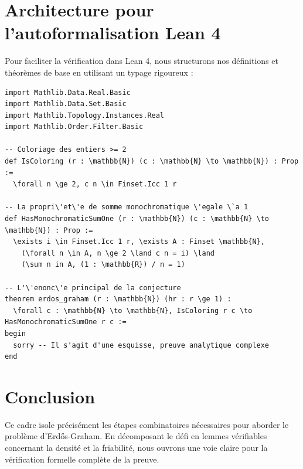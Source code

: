 \documentclass[12pt,a4paper]{article}
\begin{document}
\section{Architecture pour l'autoformalisation Lean 4}
Pour faciliter la v\'erification dans Lean 4, nous structurons nos d\'efinitions et th\'eor\`emes de base en utilisant un typage rigoureux :

\begin{verbatim}
import Mathlib.Data.Real.Basic
import Mathlib.Data.Set.Basic
import Mathlib.Topology.Instances.Real
import Mathlib.Order.Filter.Basic

-- Coloriage des entiers >= 2
def IsColoring (r : \mathbb{N}) (c : \mathbb{N} \to \mathbb{N}) : Prop :=
  \forall n \ge 2, c n \in Finset.Icc 1 r

-- La propri\'et\'e de somme monochromatique \'egale \`a 1
def HasMonochromaticSumOne (r : \mathbb{N}) (c : \mathbb{N} \to \mathbb{N}) : Prop :=
  \exists i \in Finset.Icc 1 r, \exists A : Finset \mathbb{N},
    (\forall n \in A, n \ge 2 \land c n = i) \land
    (\sum n in A, (1 : \mathbb{R}) / n = 1)

-- L'\'enonc\'e principal de la conjecture
theorem erdos_graham (r : \mathbb{N}) (hr : r \ge 1) :
  \forall c : \mathbb{N} \to \mathbb{N}, IsColoring r c \to HasMonochromaticSumOne r c :=
begin
  sorry -- Il s'agit d'une esquisse, preuve analytique complexe
end
\end{verbatim}

\section{Conclusion}
Ce cadre isole pr\'ecis\'ement les \'etapes combinatoires n\'ecessaires pour aborder le probl\`eme d'Erd\H{o}s-Graham. En d\'ecomposant le d\'efi en lemmes v\'erifiables concernant la densit\'e et la friabilit\'e, nous ouvrons une voie claire pour la v\'erification formelle compl\`ete de la preuve.
\end{document}

